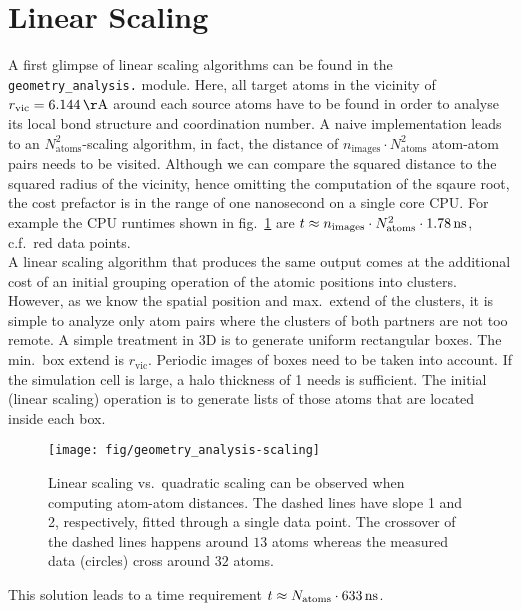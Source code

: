\documentclass[oribibl]{llncs}
\newcommand{\um}[1]{_{\mathrm{#1}}}
\newcommand{\ttt}[1]{\texttt{#1}}
\begin{document}
\section{Linear Scaling}\label{sec:linear-scaling}
%
A first glimpse of linear scaling algorithms can be found in the
\ttt{geometry\_analysis.} module.
Here, all target atoms in the vicinity of $r\um{vic} = \unit[6.144]{\AA}$ around each source atoms
have to be found in order to analyse its local bond structure
and coordination number.
A naive implementation leads to an $N\um{atoms}^2$-scaling algorithm,
in fact, the distance of $n\um{images} \cdot N\um{atoms}^2$ atom-atom pairs
needs to be visited.
Although we can compare the squared distance to the squared radius of the vicinity,
hence omitting the computation of the sqaure root, the cost prefactor
is in the range of one nanosecond on a single core CPU.
For example the CPU runtimes shown in fig.~\ref{fig:geometry-analysis-scaling}
are $t \approx n\um{images} \cdot N\um{atoms}^2 \cdot \unit[1.78]{ns}$, c.f.~red data points.
\\
A linear scaling algorithm that produces the same output comes at the additional
cost of an initial grouping operation of the atomic positions into clusters.
However, as we know the spatial position and max.~extend of the clusters,
it is simple to analyze only atom pairs where the clusters of both partners
are not too remote.
A simple treatment in 3D is to generate uniform rectangular boxes. 
The min.~box extend is $r\um{vic}$.
Periodic images of boxes need to be taken into account.
If the simulation cell is large, a halo thickness of 1 needs is sufficient.
The initial (linear scaling) operation is to generate lists of those atoms
that are located inside each box.
%
\begin{figure}
  \begin{minipage}[c]{.990\textwidth}
	\texttt{[image: fig/geometry\_analysis-scaling]} %
  \end{minipage}\hfill
  \begin{minipage}[c]{.009\textwidth}
  \end{minipage}
  \label{fig:geometry-analysis-scaling}
  \caption{
  Linear scaling vs.~quadratic scaling can be observed when computing atom-atom distances.
  The dashed lines have slope 1 and 2, respectively, fitted through a single data point.
  The crossover of the dashed lines happens around $13$ atoms 
  whereas the measured data (circles) cross around $32$ atoms.
  }
\end{figure}
%
%
This solution leads to a time requirement $t \approx N\um{atoms} \cdot \unit[633]{ns}$.


 
\end{document}
